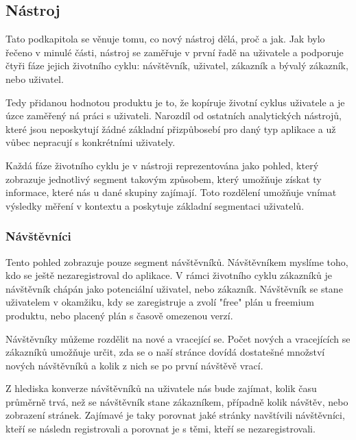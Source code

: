 \documentclass[bc,female,java,dept456]{diploma}						%
\begin{document}
\subsection{Nástroj}

Tato podkapitola se věnuje tomu, co nový nástroj dělá, proč a jak. Jak bylo řečeno v minulé části, nástroj se zaměřuje v první řadě na uživatele a podporuje čtyři fáze jejich životního cyklu: návštěvník, uživatel, zákazník a bývalý zákazník, nebo uživatel.

Tedy přidanou hodnotou produktu je to, že kopíruje životní cyklus uživatele a je úzce zaměřený ná práci s uživateli. Narozdíl od ostatních analytických nástrojů, které jsou neposkytují žádné základní přizpůbosebí pro daný typ aplikace a už vůbec nepracují s konkrétními uživately.

Každá fáze životního cyklu je v nástroji reprezentována jako pohled, který zobrazuje jednotlivý segment takovým způsobem, který umožňuje získat ty informace, které nás u dané skupiny zajímají. Toto rozdělení umožňuje vnímat výsledky měření v kontextu a poskytuje základní segmentaci uživatelů.



\subsubsection{Návštěvníci}

Tento pohled zobrazuje pouze segment návštěvníků. Návštěvníkem myslíme toho, kdo se ještě nezaregistroval do aplikace. V rámci životního cyklu zákazníků je návštěvník chápán jako potenciální uživatel, nebo zákazník. Návštěvník se stane uživatelem v okamžiku, kdy se zaregistruje a zvolí "free" plán u freemium produktu, nebo placený plán s časově omezenou verzí.

Návštěvníky můžeme rozdělit na nové a vracející se. Počet nových a vracejících se zákazníků umožňuje určit, zda se o naší stránce dovídá dostatešné množství nových návštěvníků a kolik z nich se po první návštěvě vrací. 

Z hlediska konverze návštěvníků na uživatele nás bude zajímat, kolik času průměrně trvá, než se návštěvník stane zákazníkem, případně kolik návštěv, nebo zobrazení stránek. Zajímavé je taky porovnat jaké stránky navštívili návštěvníci, kteří se následn registrovali a porovnat je s těmi, kteří se nezaregistrovali.
\end{document}
